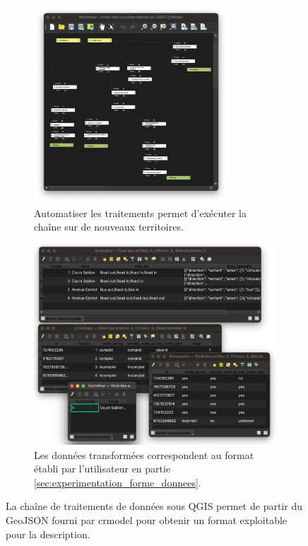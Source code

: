 \begin{figure}[ht]
    \centering
    \begin{subfigure}[t]{.49\linewidth}
        \centering
        \includegraphics[width=0.8\textwidth]{images/experimentation/pipeline_processing_crmodel.png}
        \caption{Automatiser les traitements permet d'exécuter la chaîne sur de nouveaux territoires.}
        \label{fig:experimentation_transformation_qgis}
    \end{subfigure}
    \begin{subfigure}[t]{.49\linewidth}
        \centering
        \includegraphics[width=\textwidth]{images/experimentation/resultat_processing_crmodel.png}
        \caption{Les données transformées correspondent au format établi par l'utilisateur en partie \ref{sec:experimentation_forme_donnees}.}
        \label{fig:experimentation_transformation_resultat_qgis}
    \end{subfigure}
    \caption{La chaîne de traitements de données sous QGIS permet de partir du GeoJSON fourni par crmodel pour obtenir un format exploitable pour la description.}
    \label{fig:experimentation_chaine_donnees_qgis}
\end{figure}

